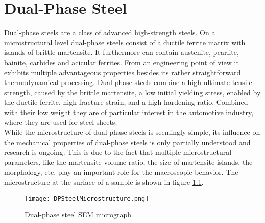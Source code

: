 \chapter{Dual-Phase Steel}

Dual-phase steels are a class of advanced high-strength steels. On a microstructural level dual-phase steels consist of a ductile ferrite matrix with islands of brittle martensite. It furthermore can contain austenite, pearlite, bainite, carbides and acicular ferrites. From an engineering point of view it exhibits multiple advantageous properties besides its rather straightforward thermodynamical processing. Dual-phase steels combine a high ultimate tensile strength, caused by the brittle martensite, a low initial yielding stress, enabled by the ductile ferrite, high fracture strain, and a high hardening ratio. Combined with their low weight they are of particular interest in the automotive industry, where they are used for steel sheets. \\

While the microstructure of dual-phase steels is seemingly simple, its influence on the mechanical properties of dual-phase steels is only partially understood and research is ongoing. This is due to the fact that multiple microstructural parameters, like the martensite volume ratio, the size of martensite islands, the morphology, etc. play an important role for the macroscopic behavior. The microstructure at the surface of a sample is shown in figure \ref{fig:DPMicrostructure}. \\

\begin{figure}
\centering
  \texttt{[image: DPSteelMicrostructure.png]}
  \caption{Dual-phase steel SEM micrograph}
  \label{fig:DPMicrostructure}
\end{figure}

